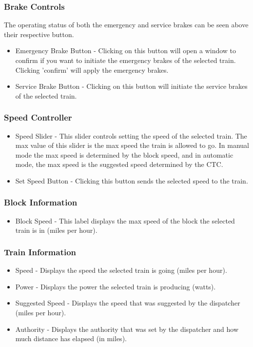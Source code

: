 \documentclass[letterpaper]{article}
\begin{document}
	\subsubsection{Brake Controls}
	The operating status of both the emergency and service brakes can be seen above their respective button.
		\begin{itemize}
			\item Emergency Brake Button - Clicking on this button will open a window to confirm if you want to initiate the emergency brakes of the selected train. Clicking 'confirm' will apply the emergency brakes.
			\item Service Brake Button -  Clicking on this button will initiate the service brakes of the selected train.
		\end{itemize}
	
	\subsubsection{Speed Controller}
		\begin{itemize}
			\item Speed Slider - This slider controls setting the speed of the selected train. The max value of this slider is the max speed the train is allowed to go. In manual mode the max speed is determined by the block speed, and in automatic mode, the max speed is the suggested speed determined by the CTC.
			\item Set Speed Button - Clicking this button sends the selected speed to the train. 
		\end{itemize}
	\subsubsection{Block Information}
		\begin{itemize}
			\item Block Speed - This label displays the max speed of the block the selected train is in (miles per hour).  
		\end{itemize}
	\subsubsection{Train Information}
		\begin{itemize}
			\item Speed - Displays the speed the selected train is going (miles per hour). 
			\item Power - Displays the power the selected train is producing (watts). 
			\item Suggested Speed - Displays the speed that was suggested by the dispatcher (miles per hour). 
			\item Authority - Displays the authority that was set by the dispatcher and how much distance has elapsed (in miles).
		\end{itemize}
\end{document}
